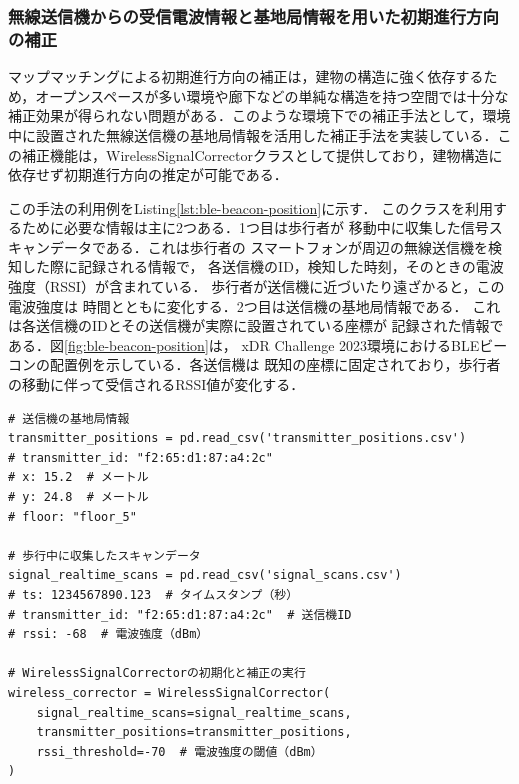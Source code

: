 
\subsubsection{無線送信機からの受信電波情報と基地局情報を用いた初期進行方向の補正}

マップマッチングによる初期進行方向の補正は，建物の構造に強く依存するため，オープンスペースが多い環境や廊下などの単純な構造を持つ空間では十分な補正効果が得られない問題がある．このような環境下での補正手法として，環境中に設置された無線送信機の基地局情報を活用した補正手法を実装している．この補正機能は，WirelessSignalCorrectorクラスとして提供しており，建物構造に依存せず初期進行方向の推定が可能である．

この手法の利用例をListing\ref{lst:ble-beacon-position}に示す．
このクラスを利用するために必要な情報は主に2つある．1つ目は歩行者が
移動中に収集した信号スキャンデータである．これは歩行者の
スマートフォンが周辺の無線送信機を検知した際に記録される情報で，
各送信機のID，検知した時刻，そのときの電波強度（RSSI）が含まれている．
歩行者が送信機に近づいたり遠ざかると，この電波強度は
時間とともに変化する．2つ目は送信機の基地局情報である．
これは各送信機のIDとその送信機が実際に設置されている座標が
記録された情報である．図\ref{fig:ble-beacon-position}は，
xDR Challenge 2023環境におけるBLEビーコンの配置例を示している．各送信機は
既知の座標に固定されており，歩行者の移動に伴って受信されるRSSI値が変化する．

\begin{lstlisting}[caption={WirelessSignalCorrectorの使用例},label=lst:ble-beacon-position,float=h]
# 送信機の基地局情報
transmitter_positions = pd.read_csv('transmitter_positions.csv')
# transmitter_id: "f2:65:d1:87:a4:2c"
# x: 15.2  # メートル
# y: 24.8  # メートル
# floor: "floor_5"

# 歩行中に収集したスキャンデータ
signal_realtime_scans = pd.read_csv('signal_scans.csv')
# ts: 1234567890.123  # タイムスタンプ（秒）
# transmitter_id: "f2:65:d1:87:a4:2c"  # 送信機ID
# rssi: -68  # 電波強度（dBm）

# WirelessSignalCorrectorの初期化と補正の実行
wireless_corrector = WirelessSignalCorrector(
    signal_realtime_scans=signal_realtime_scans,
    transmitter_positions=transmitter_positions,
    rssi_threshold=-70  # 電波強度の閾値（dBm）
)
\end{lstlisting}

